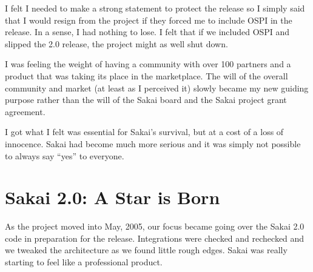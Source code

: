 \documentclass[12pt]{book}
\begin{document}
I felt I needed to make a strong statement to
protect the release so I simply said that
I would resign from the project if they forced
me to include OSPI in the release.
In a sense, I had nothing to lose.  I felt
that if we included OSPI and slipped the 2.0
release, the project might as well shut down.

I was feeling the weight of having a community with
over 100 partners and a product that was taking its
place in the marketplace.
The will of the overall community and market
(at least as I perceived it) slowly
became my new guiding purpose rather than
the will of the Sakai board and the Sakai project
grant agreement.

I got what I felt was essential for Sakai's survival,
but at a cost of a loss of innocence.
Sakai had become much more serious and it was
simply not possible to always say ``yes'' to
everyone.

\chapter{Sakai 2.0: A Star is Born}

As the project moved into May, 2005, our focus became
going over the Sakai 2.0 code in preparation for
the release.  Integrations were checked and rechecked
and we tweaked the architecture as we found little
rough edges.  Sakai was really starting to feel like a professional product.
\end{document}
